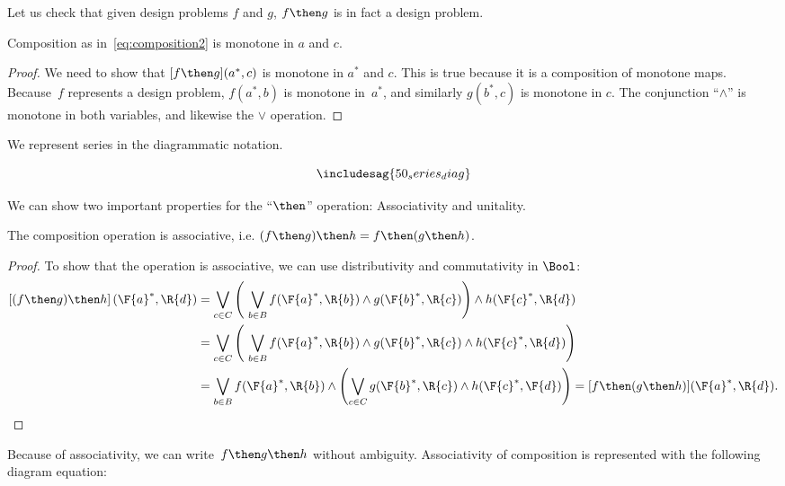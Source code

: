 Let us check that given design problems $f$ and $g$, $f\then g$ is in fact a design problem.
\begin{lemma}
    Composition as in~\cref{eq:composition2} is monotone in $a$ and $c$.
\end{lemma}
\begin{proof}
 We need to show that $[f\then g](a^*,c)$ is monotone in $a^*$ and $c$. This is true
 because it is a composition of monotone maps. Because~$f$ represents a design problem, $f(a^*,b)$ is monotone in~$a^*$,
 and similarly $g(b^*,c)$  is monotone in $c$. The conjunction ``$\wedge$'' is monotone in both variables, and likewise the $\vee$ operation.
 \end{proof}

We represent series in the diagrammatic notation.

\begin{equation}
\includesag{50_series_diag}
\end{equation}

We can show two important properties for the ``$\then$'' operation: Associativity and unitality.

\begin{lemma}
    The composition operation is associative, i.e. $(f\then g)\then h = f\then (g\then h)$.
\end{lemma}

\begin{proof}
To show that the operation is associative, we can use distributivity and commutativity in $\Bool$:
%
\begin{equation}
\begin{aligned}
\left[(f\then g) \then h\right] (\F{a}^*,\R{d})
&= \bigvee_{c \in C} \left (\ \bigvee_{b\in B } f(\F{a}^*,\R{b}) \wedge g(\F{b}^*,\R{c}) \right )  \wedge  h (\F{c}^*, \R{d}) \\
&= \bigvee_{c \in C} \left (\ \bigvee_{b\in B } f(\F{a}^*,\R{b})
\wedge g(\F{b}^*,\R{c}) \wedge h (\F{c}^*, \R{d})
    \right ) \\
&= \bigvee_{b \in B } f(\F{a}^*,\R{b}) \wedge \left ( \bigvee_{c\in C} g(\F{b}^*,\R{c}) \wedge h (\F{c}^*, \F{d}) \right ) = [f \then (g \then h )] (\F{a}^*, \R{d}).
\end{aligned}
\end{equation}
%
\end{proof}

Because of associativity, we can write~$f\then g\then h$ without ambiguity.
Associativity of composition is represented with the following diagram equation:


